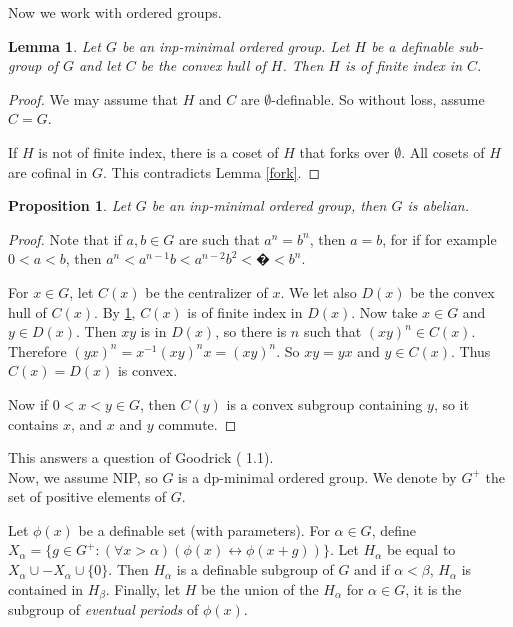 \documentclass[english]{article}
\newtheorem{prop}[thm]{Proposition}
\newtheorem{lemme}[thm]{Lemma}
\theoremstyle{definition}
\theoremstyle{mystyle}
\theoremstyle{remark}
\begin{document}
Now we work with ordered groups.

\begin{lemme}\label{findex}
Let $G$ be an inp-minimal ordered group. Let $H$ be a definable sub-group of $G$ and let $C$ be the convex hull of $H$. Then $H$ is of finite index in $C$.
\end{lemme}
\begin{proof}
We may assume that $H$ and $C$ are $\emptyset$-definable. So without loss, assume $C=G$.

If $H$ is not of finite index, there is a coset of $H$ that forks over $\emptyset$. All cosets of $H$ are cofinal in $G$. This contradicts Lemma \ref{fork}.
\end{proof}

\begin{prop}
Let $G$ be an inp-minimal ordered group, then $G$ is abelian.
\end{prop}
\begin{proof}
Note that if $a,b \in G$ are such that $a^n = b^n$, then $a=b$, for if for example $0<a<b$, then $a^n < a^{n-1}b < a^{n-2}b^2 < � < b^n$.

For $x\in G$, let $C(x)$ be the centralizer of $x$. We let also $D(x)$ be the convex hull of $C(x)$. By \ref{findex}, $C(x)$ is of finite index in $D(x)$. Now take $x\in G$ and $y\in D(x)$. Then $xy$ is in $D(x)$, so there is $n$ such that $(xy)^{n} \in C(x)$. Therefore $(yx)^{n} = x^{-1} (xy)^{n} x = (xy)^{n}$. So $xy=yx$ and $y \in C(x)$. Thus $C(x)=D(x)$ is convex.

Now if $0 <x<y \in G$, then $C(y)$ is a convex subgroup containing $y$, so it contains $x$, and $x$ and $y$ commute.
\end{proof}

This answers a question of Goodrick (\cite{Good} 1.1).
\\

Now, we assume NIP, so $G$ is a dp-minimal ordered group. We denote by $G^+$ the set of positive elements of $G$.

Let $\phi(x)$ be a definable set (with parameters). For $\alpha \in G$, define $X_\alpha = \{g \in G^+ : (\forall x > \alpha) (\phi(x) \leftrightarrow \phi(x+g))\}$. Let $H_\alpha$ be equal to $X_\alpha \cup -X_\alpha \cup \{0\}$. Then $H_\alpha$ is a definable subgroup of $G$ and if $\alpha < \beta$, $H_\alpha$ is contained in $H_\beta$. Finally, let $H$ be the union of the $H_\alpha$ for $\alpha \in G$, it is the subgroup of \emph{eventual periods} of $\phi(x)$.
\end{document}
